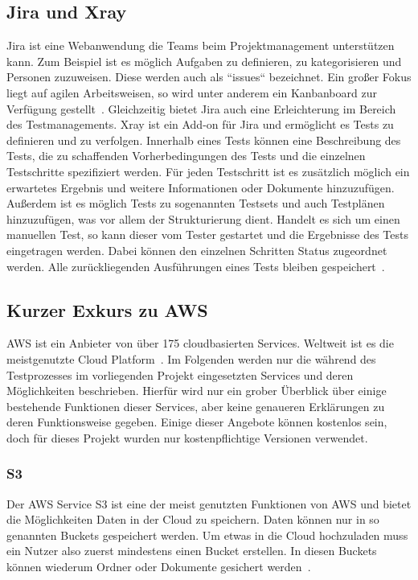 \subsection{Jira und Xray}
Jira ist eine Webanwendung die Teams beim Projektmanagement unterstützen kann. Zum Beispiel ist es möglich Aufgaben zu definieren, zu kategorisieren und Personen zuzuweisen. Diese werden auch als ``issues`` bezeichnet. Ein großer Fokus liegt auf agilen Arbeitsweisen, so wird unter anderem ein Kanbanboard zur Verfügung gestellt~\cite{Atlassian.}.
\newline
Gleichzeitig bietet Jira auch eine Erleichterung im Bereich des Testmanagements. Xray ist ein Add-on für Jira und ermöglicht es Tests zu definieren und zu verfolgen. Innerhalb eines Tests können eine Beschreibung des Tests, die zu schaffenden Vorherbedingungen des Tests und die einzelnen Testschritte spezifiziert werden. Für jeden Testschritt ist es zusätzlich möglich ein erwartetes Ergebnis und weitere Informationen oder Dokumente hinzuzufügen. Außerdem ist es möglich Tests zu sogenannten Testsets und auch Testplänen hinzuzufügen, was vor allem der Strukturierung dient.
\newline
Handelt es sich um einen manuellen Test, so kann dieser vom Tester gestartet und die Ergebnisse des Tests eingetragen werden. Dabei können den einzelnen Schritten Status zugeordnet werden. Alle zurückliegenden Ausführungen eines Tests bleiben gespeichert~\cite{Xray.}.

\subsection{Kurzer Exkurs zu \ac{AWS}}
\ac{AWS} ist ein Anbieter von über 175 cloudbasierten Services. Weltweit ist es die meistgenutzte Cloud Platform~\cite{Amazon.}. Im Folgenden werden nur die während des Testprozesses im vorliegenden Projekt eingesetzten Services und deren Möglichkeiten beschrieben. Hierfür wird nur ein grober Überblick über einige bestehende Funktionen dieser Services, aber keine genaueren Erklärungen zu deren Funktionsweise gegeben. Einige dieser Angebote können kostenlos sein, doch für dieses Projekt wurden nur kostenpflichtige Versionen verwendet.

\subsubsection{\ac{S3}}
Der \ac{AWS} Service \ac{S3} ist eine der meist genutzten Funktionen von \ac{AWS} und bietet die Möglichkeiten Daten in der Cloud zu speichern. Daten können nur in so genannten Buckets gespeichert werden. Um etwas in die Cloud hochzuladen muss ein Nutzer also zuerst mindestens einen Bucket erstellen. In diesen Buckets können wiederum Ordner oder Dokumente gesichert werden~\cite{Amazon.b}.
